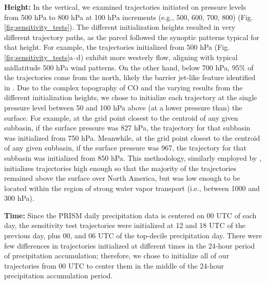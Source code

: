 \documentclass[draft]{agujournal2019}
\begin{document}
\textbf{Height:} In the vertical, we examined trajectories initiated on pressure levels from 500 hPa to 800 hPa at 100 hPa increments (e.g., 500, 600, 700, 800) (Fig. \ref{fig:sensitivity_tests}). The different initialization heights resulted in very different trajectory paths, as the parcel followed the synoptic patterns typical for that height. For example, the trajectories initialized from 500 hPa (Fig. \ref{fig:sensitivity_tests}a--d) exhibit more westerly flow, aligning with typical midlatitude 500 hPa wind patterns. On the other hand, below 700 hPa, 95\% of the trajectories come from the north, likely the barrier jet-like feature identified in . Due to the complex topography of CO and the varying results from the different initialization heights, we chose to initialize each trajectory at the single pressure level between 50 and 100 hPa above (at a lower pressure than) the surface. For example, at the grid point closest to the centroid of any given subbasin, if the surface pressure was 827 hPa, the trajectory for that subbasin was initialized from 750 hPa. Meanwhile, at the grid point closest to the centroid of any given subbasin, if the surface pressure was 967, the trajectory for that subbasin was initialized from 850 hPa. This methodology, similarly employed by , initializes trajectories high enough so that the majority of the trajectories remained above the surface over North America, but was low enough to be located within the region of strong water vapor transport (i.e., between 1000 and 300 hPa). 

\textbf{Time:} Since the PRISM daily precipitation data is centered on 00 UTC of each day, the sensitivity test trajectories were initialized at 12 and 18 UTC of the previous day, plus 00, and 06 UTC of the top-decile precipitation day. There were few differences in trajectories initialized at different times in the 24-hour period of precipitation accumulation; therefore, we chose to initialize all of our trajectories from 00 UTC to center them in the middle of the 24-hour precipitation accumulation period. 
\end{document}
